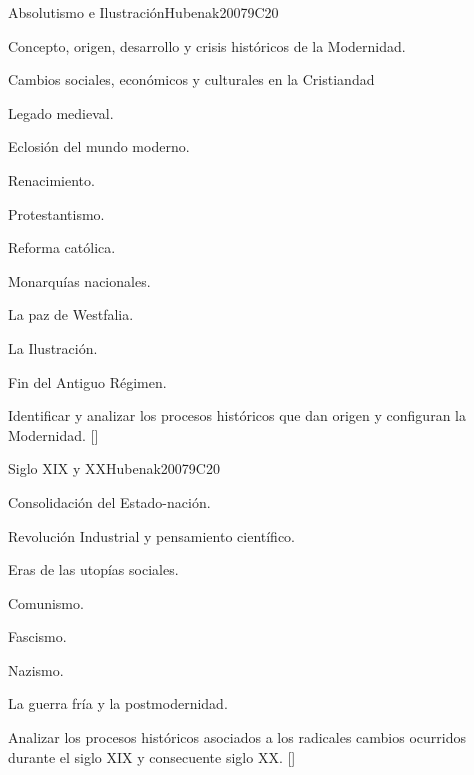 \begin{syllabus}
\begin{unit}{}{Absolutismo e Ilustración}{Hubenak2007}{9}{C20}
\begin{topics}
	\item Concepto, origen, desarrollo y crisis históricos de la Modernidad.
	\item Cambios sociales, económicos y culturales en la Cristiandad
	      \begin{subtopics}
		\item Legado medieval.
		\item Eclosión del mundo moderno.
	      \end{subtopics}
	\item Renacimiento.
	\item Protestantismo.
	\item Reforma católica.
	\item Monarquí­as nacionales.
	\item La paz de Westfalia.
	\item La Ilustración.
	\item Fin del Antiguo Régimen.
\end{topics}
\begin{learningoutcomes}
	\item Identificar y analizar los procesos históricos que dan origen y configuran la Modernidad. [\Familiarity]
\end{learningoutcomes}
\end{unit}

\begin{unit}{}{Siglo XIX y XX}{Hubenak2007}{9}{C20}
\begin{topics}
	\item Consolidación del Estado-nación.
	\item Revolución Industrial y pensamiento cientí­fico.
	\item Eras de las utopí­as sociales.
	      \begin{subtopics}
		\item Comunismo.
		\item Fascismo.
		\item Nazismo.
	      \end{subtopics}
	\item La guerra frí­a y la postmodernidad.
\end{topics}
\begin{learningoutcomes}
	\item Analizar los procesos históricos asociados a los radicales cambios ocurridos durante el siglo XIX y consecuente siglo XX. [\Familiarity]
\end{learningoutcomes}
\end{unit}


\end{syllabus}
